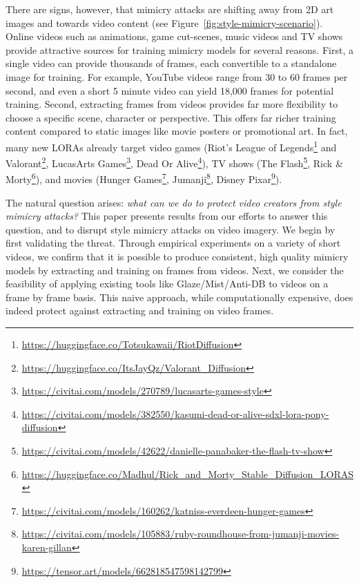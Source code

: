 There are signs, however, that mimicry attacks are shifting away from 2D art
images and towards video content (see Figure~\ref{fig:style-mimicry-scenario}). Online videos such as animations, game
cut-scenes, music videos and TV shows provide attractive sources
for training mimicry models for several reasons. First, a single video can
provide thousands of frames, each convertible to a standalone image for
training. For example, YouTube videos range from 30 to 60 frames per second,
and even a short 5 minute video can yield 18,000 frames for potential
training. Second, extracting frames from videos provides far more flexibility
to choose a specific scene, character or perspective. This offers far richer
training content compared to static images like movie posters or promotional
art. In fact, many new LORAs already target video games (Riot's League of
Legends\footnote{\url{https://huggingface.co/Totsukawaii/RiotDiffusion}} and
Valorant\footnote{\url{https://huggingface.co/ItsJayQz/Valorant_Diffusion}},
LucasArts
Games\footnote{\url{https://civitai.com/models/270789/lucasarts-games-style}},
Dead Or
Alive\footnote{\url{https://civitai.com/models/382550/kasumi-dead-or-alive-sdxl-lora-pony-diffusion}}),
TV shows (The
Flash\footnote{\url{https://civitai.com/models/42622/danielle-panabaker-the-flash-tv-show}},
Rick \&
Morty\footnote{\url{https://huggingface.co/Madhul/Rick_and_Morty_Stable_Diffusion_LORAS}}),
and movies (Hunger
Games\footnote{\url{https://civitai.com/models/160262/katniss-everdeen-hunger-games}},
Jumanji\footnote{\url{https://civitai.com/models/105883/ruby-roundhouse-from-jumanji-movies-karen-gillan}},
Disney Pixar\footnote{\url{https://tensor.art/models/662818547598142799}}). 


The natural question arises: {\em what can we do to protect video creators
  from style mimicry attacks?} This paper presents results from our efforts 
 to answer this question, and to disrupt style mimicry attacks on
video imagery. We begin by first validating the threat. Through empirical
experiments on a variety of short videos, we confirm that it is possible to
produce consistent, high quality mimicry models by extracting and training on
frames from videos. Next, we consider the feasibility of applying existing
tools like Glaze/Mist/Anti-DB to videos on a frame by frame basis. This naive
approach, while computationally expensive, does indeed protect against
extracting and training on video frames.

